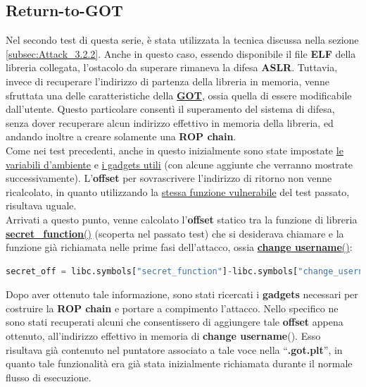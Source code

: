 \subsection{Return-to-GOT}
\label{subsec:Test_3-2}
Nel secondo test di questa serie, è stata utilizzata la tecnica discussa nella sezione \ref{subsec:Attack_3.2.2}. Anche in questo caso, essendo disponibile il file \textbf{ELF} della libreria collegata, l'ostacolo da superare rimaneva la difesa \textbf{ASLR}.
Tuttavia, invece di recuperare l'indirizzo di partenza della libreria in memoria, venne sfruttata una delle caratteristiche della \hyperref[subsec:PLT-GOT]{\textbf{GOT}}, ossia quella di essere modificabile dall'utente.
Questo particolare consentì il superamento del sistema di difesa, senza dover recuperare alcun indirizzo effettivo in memoria della libreria, ed andando inoltre a creare solamente una \textbf{ROP chain}.\\
Come nei test precedenti, anche in questo inizialmente sono state impostate \hyperref[env]{le variabili d'ambiente} e \hyperref[gadgets]{i gadgets utili} (con alcune aggiunte che verranno mostrate successivamente). L'\textbf{offset} per sovrascrivere l'indirizzo di ritorno non venne ricalcolato, in quanto 
utilizzando la \hyperref[change username]{stessa funzione vulnerabile} del test passato, risultava uguale.\\
Arrivati a questo punto, venne calcolato l'\textbf{offset} statico tra la funzione di libreria \hyperref[secret function]{\textbf{secret\_function}()} (scoperta nel passato test) che si desiderava chiamare e la funzione già richiamata nelle prime fasi dell'attacco, 
ossia \hyperref[change username]{\textbf{change username}()}:
\begin{lstlisting}[language=Python, label=cu-idx, caption={Calcolo \textbf{offset} statico tra funzioni della libreria condivisa \textbf{secret\_function}() e \textbf{change\_username}().}, style =Python]
secret_off = libc.symbols["secret_function"]-libc.symbols["change_username"]         
\end{lstlisting}
Dopo aver ottenuto tale informazione, sono stati ricercati i \textbf{gadgets} necessari per costruire la \textbf{ROP chain} e portare a compimento l'attacco. Nello specifico ne sono stati recuperati alcuni che consentissero di aggiungere tale \textbf{offset} appena ottenuto,
all'indirizzo effettivo in memoria di \textbf{change username}(). Esso risultava già contenuto nel puntatore associato a tale voce nella ``\textbf{.got.plt}'', in quanto tale funzionalità era già stata inizialmente richiamata durante il normale flusso di esecuzione.
